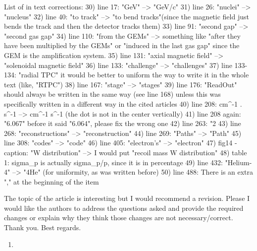 \documentclass[a4paper,11pt,twoside]{article}
\begin{document}
List of in text corrections:
30)	line 17: "GeV" --> "GeV/c"
31)	line 26: "nuclei" --> "nucleus"
32)	line 40: "to track" --> "to bend tracks"(since the magnetic field just bends the track and then the detector tracks them)
33)	line 91: "second gap" --> "second gas gap"
34)	line 110: "from the GEMs" -->  something like "after they have been multiplied by the GEMs" or "induced in the last gas gap" since the GEM is the amplification system.
35)	line 131: "axial magnetic field" --> "solenoidal magnetic field"
36)	line 133: "challenge" --> "challenges"
37)	line 133-134: "radial TPC" it would be better to uniform the way to write it in the whole text (like, "RTPC")
38)	line 167: "stage" --> "stages"
39)	line 176: "ReadOut" should always be written in the same way (see line 168) unless this was specifically written in a different way in the cited articles
40)	line 208: cm^{-1} . s^{-1} --> cm^{-1} \cdot s^{-1} (the dot is not in the center vertically)
41)	line 208 again: "6.067" before it said "6.064", please fix the wrong one
42)	line 263: "2%
43)	line 268: "reconstructions" --> "reconstruction"
44)	line 269: "Paths" --> "Path"
45)	line 308: "codes" --> "code"
46)	line 405: "electron's" --> "electron"
47)	fig14 - caption: "W distribution" --> I would put "recoil mass W distribution"
48)	table 1: sigma_p is actually sigma_p/p, since it is in percentage
49)	line 432: "Helium-4" --> "4He" (for uniformity, as was written before)
50)	line 488: There is an extra "," at the beginning of the item

The topic of the article is interesting but I would recommend a revision. Please I would like the authors to address the questions asked and provide the required changes or explain why they think those changes are not necessary/correct. Thank you. Best regards.

\begin{enumerate}
\item 
\textcolor{blue}{ }
  
\end{enumerate}
\end{document}
